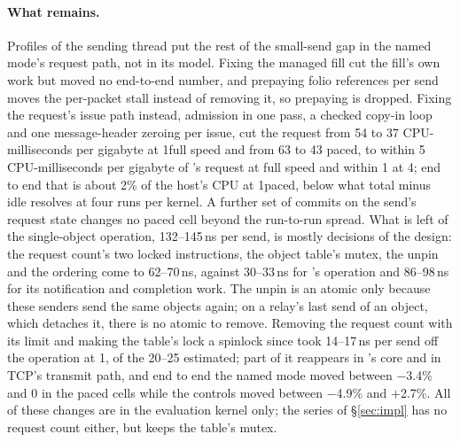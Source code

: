 \paragraph{What remains.} Profiles of the sending thread put the rest of the small-send gap in
the named mode's request path, not in its model. Fixing the managed fill cut the fill's own
work but moved no end-to-end number, and prepaying folio references per send moves the
per-packet stall instead of removing it, so prepaying is dropped.
Fixing the request's issue path instead, admission in one pass, a checked copy-in loop and one
message-header zeroing per issue, cut the request from 54 to 37 CPU-milliseconds per gigabyte
at 1\KiB full speed and from 63 to 43 paced, to within 5 CPU-milliseconds per gigabyte of
\sendzc's request at full speed and within 1 at 4\KiB; end to end that is about 2\% of the
host's CPU at 1\KiB paced, below what total minus idle resolves at four runs per kernel.
A further set of commits on the send's request state changes no paced cell beyond the
run-to-run spread. %
What is left of the single-object operation, 132--145\,ns per send, is mostly decisions of the
design: the request count's two locked instructions, the object table's mutex, the unpin and
the ordering come to 62--70\,ns, against 30--33\,ns for \sendzc's operation and 86--98\,ns for
its notification and completion work. The unpin is an atomic only because these senders send
the same objects again; on a relay's last send of an object, which detaches it, there is no
atomic to remove. %
Removing the request count with its limit and making the table's lock a spinlock since took
14--17\,ns per send off the operation at 1\KiB, of the 20--25 estimated; part of it reappears
in \iouring's core and in TCP's transmit path, and end to end the named mode moved between
$-$3.4\% and 0 in the paced cells while the controls moved between $-$4.9\% and $+$2.7\%.
All of these changes are in the evaluation kernel only; the series of \S\ref{sec:impl} has no
request count either, but keeps the table's mutex. %


